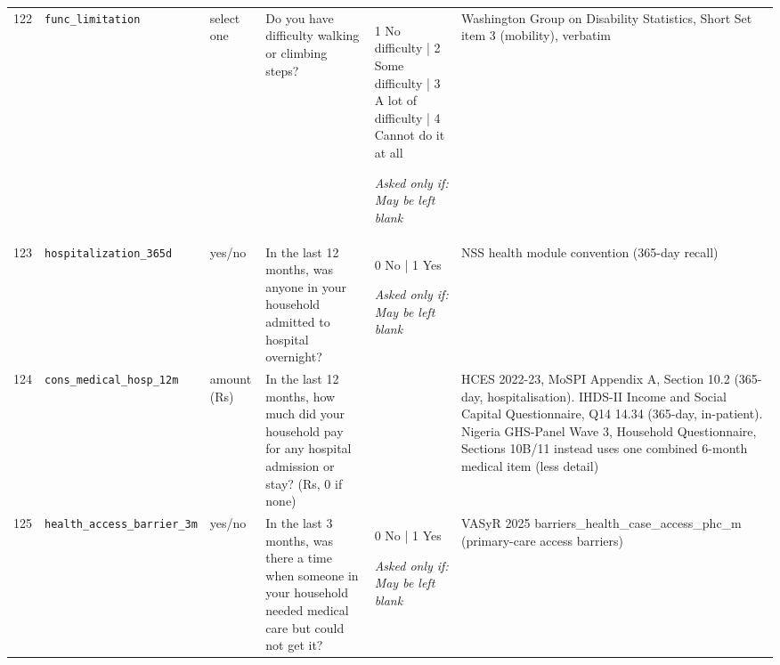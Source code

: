 \documentclass[9pt,a4paper,landscape]{article}
\begin{document}
\begin{longtable}{@{}p{0.5cm}p{3.3cm}p{1.7cm}p{7.3cm}p{5.6cm}p{5.4cm}@{}}
\footnotesize 122 & \footnotesize\texttt{func\_limitation} & \scriptsize select one & \footnotesize Do you have difficulty walking or climbing steps?\par\vspace{1pt}{\footnotesize\color{hdr}{\hifont क्या आपको चलने या सीढ़ियाँ चढ़ने में दिक़्क़त होती है?}} & \scriptsize 1 No difficulty | 2 Some difficulty | 3 A lot of difficulty | 4 Cannot do it at all\par\vspace{1pt}\textit{Asked only if: May be left blank} & \scriptsize Washington Group on Disability Statistics, Short Set item 3 (mobility), verbatim\\
\footnotesize 123 & \footnotesize\texttt{hospitalization\_365d} & \scriptsize yes/no & \footnotesize In the last 12 months, was anyone in your household admitted to hospital overnight?\par\vspace{1pt}{\footnotesize\color{hdr}{\hifont पिछले 12 महीनों में क्या आपके घर का कोई रात भर के लिए अस्पताल में भर्ती हुआ?}} & \scriptsize 0 No | 1 Yes\par\vspace{1pt}\textit{Asked only if: May be left blank} & \scriptsize NSS health module convention (365-day recall)\\
\footnotesize 124 & \footnotesize\texttt{cons\_medical\_hosp\_12m} & \scriptsize amount (Rs) & \footnotesize In the last 12 months, how much did your household pay for any hospital admission or stay? (Rs, 0 if none)\par\vspace{1pt}{\footnotesize\color{hdr}{\hifont पिछले 12 महीनों में अस्पताल में भर्ती होने पर आपके घर का कितना ख़र्च हुआ? (रुपये, न हुआ हो तो 0)}} & \scriptsize  & \scriptsize HCES 2022-23, MoSPI Appendix A, Section 10.2 (365-day, hospitalisation). IHDS-II Income and Social Capital Questionnaire, Q14 14.34 (365-day, in-patient). Nigeria GHS-Panel Wave 3, Household Questionnaire, Sections 10B/11 instead uses one combined 6-month medical item (less detail)\\
\footnotesize 125 & \footnotesize\texttt{health\_access\_barrier\_3m} & \scriptsize yes/no & \footnotesize In the last 3 months, was there a time when someone in your household needed medical care but could not get it?\par\vspace{1pt}{\footnotesize\color{hdr}{\hifont पिछले 3 महीनों में क्या कभी ऐसा हुआ कि आपके घर में किसी को इलाज की ज़रूरत थी पर मिल नहीं पाया?}} & \scriptsize 0 No | 1 Yes\par\vspace{1pt}\textit{Asked only if: May be left blank} & \scriptsize VASyR 2025 barriers\_health\_case\_access\_phc\_m (primary-care access barriers)\\

\end{longtable}
\end{document}
